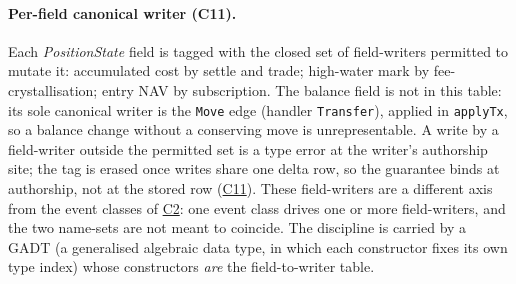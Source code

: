 \documentclass[11pt,a4paper]{article}
\begin{document}
\paragraph{Per-field canonical writer (C11).}
Each \emph{PositionState} field is tagged with the closed set of field-writers permitted to
mutate it: accumulated cost by settle and trade; high-water mark by fee-crystallisation;
entry NAV by subscription. The balance field is not in this table: its sole canonical writer
is the \texttt{Move} edge (handler \texttt{Transfer}), applied in \texttt{applyTx}, so a
balance change without a conserving move is unrepresentable. A write by a field-writer
outside the permitted set
is a type error at the writer's authorship site; the tag is erased once writes share one
delta row, so the guarantee binds at authorship, not at the stored row
(\hyperref[cond:C11]{C11}). These field-writers are a different axis from the event classes
of \hyperref[cond:C2]{C2}: one event class drives one or more field-writers, and the two
name-sets are not meant to coincide. The discipline is carried by a GADT (a generalised
algebraic data type, in which each constructor fixes its own type index) whose
constructors \emph{are} the field-to-writer table.
\end{document}
